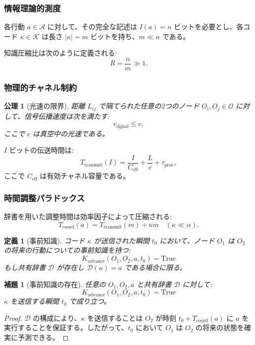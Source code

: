 \documentclass[11pt,a4paper]{article}
\newtheorem{lemma}{補題}
\newtheorem{axiom}{公理}
\newtheorem{definition}{定義}
\begin{document}
	\subsubsection{情報理論的測度}
	
	各行動 $a \in \mathcal{A}$ に対して、その完全な記述は $I(a) = n$ ビットを必要とし、各コード $\kappa \in \mathcal{K}$ は長さ $|\kappa| = m$ ビットを持ち、$m \ll n$ である。
	
	知識圧縮比は次のように定義される:
	\[
	R = \frac{n}{m} \gg 1.
	\]
	
	\subsubsection{物理的チャネル制約}
	
	\begin{axiom}[光速の限界]
		距離 $L_{ij}$ で隔てられた任意の2つのノード $O_i, O_j \in \mathcal{O}$ に対して、信号伝播速度は次を満たす:
		\[
		v_{\text{signal}} \leq c,
		\]
		ここで $c$ は真空中の光速である。
	\end{axiom}
	
	$I$ ビットの伝送時間は:
	\[
	T_{\text{transmit}}(I) = \frac{I}{C_{\text{eff}}} + \frac{L}{c} + \tau_{\text{proc}},
	\]
	ここで $C_{\text{eff}}$ は有効チャネル容量である。
	
	\subsubsection{時間調整パラドックス}
	
	辞書を用いた調整時間は効率因子によって圧縮される:
	\[
	T_{\text{coord}}(a) = T_{\text{transmit}}(m) + \kappa m \quad (\kappa \ll \alpha).
	\]
	
	\begin{definition}[事前知識]
		コード $\kappa$ が送信された瞬間 $t_0$ において、ノード $O_1$ は $O_2$ の将来の行動についての事前知識を持つ:
		\[
		K_{\text{advance}}(O_1, O_2, a, t_0) = \text{True}
		\]
		もし共有辞書 $\mathcal{D}$ が存在し $\mathcal{D}(\kappa) = a$ である場合に限る。
	\end{definition}
	
	\begin{lemma}[事前知識の存在]
		\label{lem:advance-knowledge}
		任意の $O_1, O_2, a$ と共有辞書 $\mathcal{D}$ に対して:
		\[
		K_{\text{advance}}(O_1, O_2, a, t_0) = \text{True}
		\]
		$\kappa$ を送信する瞬間 $t_0$ で成り立つ。
	\end{lemma}
	
	\begin{proof}
		$\mathcal{D}$ の構成により、$\kappa$ を送信することは $O_2$ が時刻 $t_0 + T_{\text{coord}}(a)$ に $a$ を実行することを保証する。したがって、$t_0$ において $O_1$ は $O_2$ の将来の状態を確実に予測できる。
	\end{proof}
	
\end{document}
